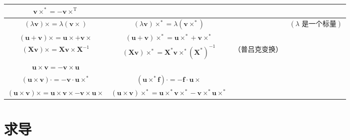 \documentclass[10pt,a4paper]{book}
\theoremstyle{thmstyle} %
\theoremstyle{defstyle} %
\theoremstyle{prostyle} %
\begin{document}
\begin{table}[htbp]

\centering

\begin{tabular}{cccc}

\toprule

$\boldsymbol{v} \times^* = -\boldsymbol{v} \times^{\text{T}}$ &  &  &  \\

\midrule

$(\lambda \boldsymbol{v}) \times = \lambda (\boldsymbol{v} \times)$ & $(\lambda \boldsymbol{v}) \times^* = \lambda (\boldsymbol{v} \times^*)$ &  & $(\lambda \text{ 是一个标量})$ \\

$(\boldsymbol{u} + \boldsymbol{v}) \times = \boldsymbol{u} \times + \boldsymbol{v} \times$ & $(\boldsymbol{u} + \boldsymbol{v}) \times^* = \boldsymbol{u} \times^* + \boldsymbol{v} \times^*$ &  &  \\

$(\boldsymbol{X} \boldsymbol{v}) \times = \boldsymbol{X} \boldsymbol{v} \times \boldsymbol{X}^{-1}$ & $(\boldsymbol{X} \boldsymbol{v}) \times^* = \boldsymbol{X}^* \boldsymbol{v} \times^* (\boldsymbol{X}^*)^{-1}$ & （普吕克变换） &  \\

$\boldsymbol{u} \times \boldsymbol{v} = -\boldsymbol{v} \times \boldsymbol{u}$ &  &  &  \\

$(\boldsymbol{u} \times \boldsymbol{v}) \cdot = -\boldsymbol{v} \cdot \boldsymbol{u} \times^*$ & $(\boldsymbol{u} \times^* \boldsymbol{f}) \cdot = -\boldsymbol{f} \cdot \boldsymbol{u} \times$ &  &  \\

$(\boldsymbol{u} \times \boldsymbol{v}) \times = \boldsymbol{u} \times \boldsymbol{v} \times -\boldsymbol{v} \times \boldsymbol{u} \times$ & $(\boldsymbol{u} \times \boldsymbol{v}) \times^* = \boldsymbol{u} \times^* \boldsymbol{v} \times^* - \boldsymbol{v} \times^* \boldsymbol{u} \times^*$ &  &  \\

\bottomrule

\end{tabular}

\end{table}



\section{求导}
\end{document}
